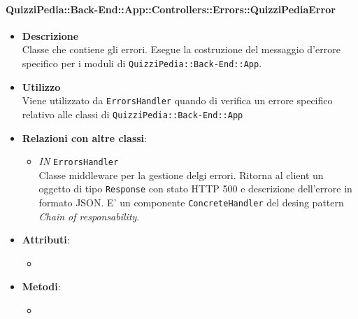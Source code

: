 \paragraph{QuizziPedia::Back-End::App::Controllers::Errors::QuizziPediaError}
	\begin{itemize}
		\item \textbf{Descrizione} \\
		Classe che contiene gli errori. Esegue la costruzione del messaggio d'errore specifico per i moduli di \texttt{QuizziPedia::Back-End::App}.
		\item \textbf{Utilizzo} \\
		Viene utilizzato da \texttt{ErrorsHandler} quando di verifica un errore specifico relativo alle classi di \texttt{QuizziPedia::Back-End::App}
		\item \textbf{Relazioni con altre classi}:
			 \begin{itemize}
			 	\item \textit{IN} \texttt{ErrorsHandler} \\
			 	Classe middleware per la gestione delgi errori. Ritorna al client un oggetto di tipo \texttt{Response} con stato HTTP 500 e descrizione dell'errore in formato JSON. E' un componente \texttt{ConcreteHandler} del desing pattern \textit{Chain of responsability}.
			 \end{itemize}
		\item \textbf{Attributi}:
			 \begin{itemize}
			 	\item 
			 \end{itemize}
		\item \textbf{Metodi}:
			\begin{itemize}
				\item 
			\end{itemize}
	\end{itemize}